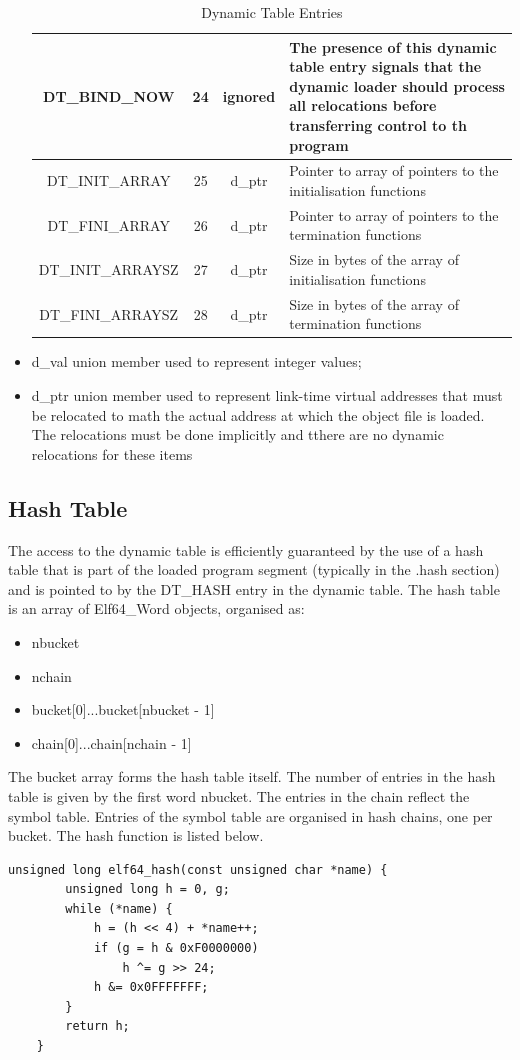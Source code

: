 \documentclass[paper=a4, fontsize=11pt]{report} %
\numberwithin{equation}{section} %
\numberwithin{figure}{section} %
\numberwithin{table}{section} %
\begin{document}
\begin{itemize}
\begin{table}[!htbp]
\begin{center}
\begin{tabular}{|c|c|c|p{10cm}|}
{\ttfamily DT\_BIND\_NOW} & 24 & {\ttfamily ignored} & The presence of this 
dynamic table entry signals that the dynamic loader should process all 
relocations before transferring control to th program\\ \hline
{\ttfamily DT\_INIT\_ARRAY} & 25 & {\ttfamily d\_ptr} & Pointer to array of 
pointers to the initialisation functions\\ \hline
{\ttfamily DT\_FINI\_ARRAY} & 26 & {\ttfamily d\_ptr} & Pointer to array of 
pointers to the termination functions\\ \hline
{\ttfamily DT\_INIT\_ARRAYSZ} & 27 & {\ttfamily d\_ptr} & Size in bytes of the 
array of initialisation functions\\ \hline
{\ttfamily DT\_FINI\_ARRAYSZ} & 28 & {\ttfamily d\_ptr} & Size in bytes of the 
array of termination functions\\ \hline
\end{tabular} \caption{Dynamic Table Entries} \end{center}
\end{table}
	\item {\ttfamily d\_val} union member used to represent integer values;
	\item {\ttfamily d\_ptr} union member used to represent link-time virtual 
	addresses that must be relocated to math the actual address at which the 
	object file is loaded. The relocations must be done implicitly and tthere 
	are no dynamic relocations for these items
\end{itemize} \newpage
\subsection{Hash Table}
The access to the dynamic table is efficiently guaranteed by the use of a hash 
table that is part of the loaded program segment (typically in the {\ttfamily 
.hash} section) and is pointed to by the {\ttfamily DT\_HASH} entry in the 
dynamic table. The hash table is an array of {\ttfamily Elf64\_Word} objects, 
organised as:
\begin{itemize}
	\item {\ttfamily nbucket}
	\item {\ttfamily nchain}
	\item {\ttfamily bucket[0]...bucket[nbucket - 1]}
	\item {\ttfamily chain[0]...chain[nchain - 1]}
\end{itemize}
The {\ttfamily bucket} array forms the hash table itself. The number of entries 
in the hash table is given by the first word {\ttfamily nbucket}. The entries 
in the {\ttfamily chain} reflect the symbol table. Entries of the symbol table 
are organised in hash chains, one per bucket. The hash function is listed below.
\begin{lstlisting}[style=ansic, caption={Program Header}, label=hashtab]
    unsigned long elf64_hash(const unsigned char *name) {
        unsigned long h = 0, g;
        while (*name) {
            h = (h << 4) + *name++;
            if (g = h & 0xF0000000)
                h ^= g >> 24;
            h &= 0x0FFFFFFF;
        }
        return h;
    }
\end{lstlisting}
\end{document}
